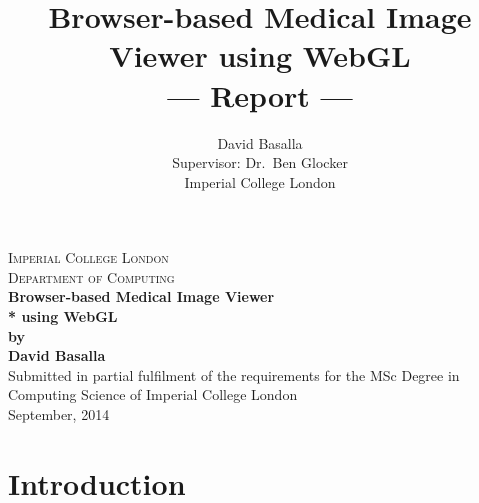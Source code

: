 \documentclass[a4paper,11pt,twoside]{article}
\title{Browser-based Medical Image Viewer using WebGL \\\Large{--- Report ---}}
\author{David Basalla\\
  \small{Supervisor: Dr.\ Ben Glocker}\\
  \small{Imperial College London}
}
\begin{document}
\begin{titlepage}

\newcommand{\HRule}{\rule{\linewidth}{0.5mm}} %

\center %
 

\textsc{Imperial College London}\\[0.5cm] %
\textsc{Department of Computing}\\[8.5cm] %




{ \large \bfseries Browser-based Medical Image Viewer\\* using WebGL}\\[0.4cm] %
{ \large \bfseries by}\\[0.4cm] %
{ \large \bfseries David Basalla}\\[10cm] %
 



{Submitted in partial fulfilment of the requirements for the MSc Degree in Computing Science of Imperial College London }\\[0.5cm] 
{September,  2014}\\[0.5cm] %



\vfill %

\end{titlepage}



\tableofcontents


\newpage
\section{Introduction}
\end{document}
